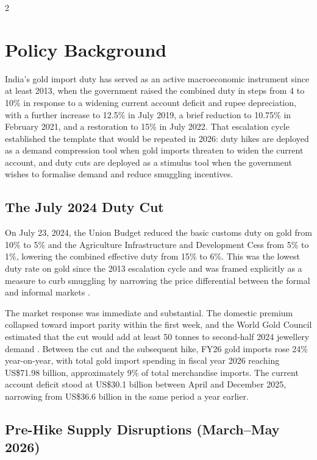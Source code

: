 \documentclass[12pt]{article}
\begin{document}
\begin{multicols}{2}
\section{Policy Background}
\label{sec:policy}

India's gold import duty has served as an active macroeconomic instrument since at least 2013, when the government raised the combined duty in steps from 4 to 10\% in response to a widening current account deficit and rupee depreciation, with a further increase to 12.5\% in July 2019, a brief reduction to 10.75\% in February 2021, and a restoration to 15\% in July 2022. That escalation cycle established the template that would be repeated in 2026: duty hikes are deployed as a demand compression tool when gold imports threaten to widen the current account, and duty cuts are deployed as a stimulus tool when the government wishes to formalise demand and reduce smuggling incentives.

\subsection*{The July 2024 Duty Cut}

On July 23, 2024, the Union Budget reduced the basic customs duty on gold from 10\% to 5\% and the Agriculture Infrastructure and Development Cess from 5\% to 1\%, lowering the combined effective duty from 15\% to 6\%. This was the lowest duty rate on gold since the 2013 escalation cycle and was framed explicitly as a measure to curb smuggling by narrowing the price differential between the formal and informal markets \citep{WGC2024Jul}.

The market response was immediate and substantial. The domestic premium collapsed toward import parity within the first week, and the World Gold Council estimated that the cut would add at least 50 tonnes to second-half 2024 jewellery demand \citep{WGC2024Aug}. Between the cut and the subsequent hike, FY26 gold imports rose 24\% year-on-year, with total gold import spending in fiscal year 2026 reaching US\$71.98 billion, approximately 9\% of total merchandise imports. The current account deficit stood at US\$30.1 billion between April and December 2025, narrowing from US\$36.6 billion in the same period a year earlier.

\subsection*{Pre-Hike Supply Disruptions (March--May 2026)}


\end{multicols}
\end{document}
